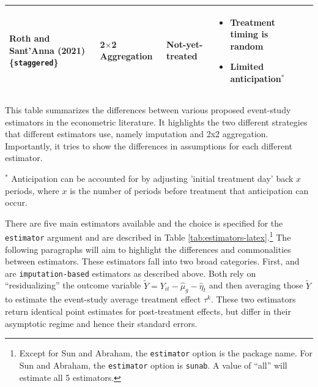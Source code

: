 \begin{landscape}
\begin{table}
\begin{threeparttable}
\begin{tabular}{L{0.2\textwidth}L{0.2\textwidth}L{0.3\textwidth}p{0.5\textwidth}c}
Roth and Sant'Anna (2021) 
\{\texttt{staggered}\}
& 2$\times$2 Aggregation 
& Not-yet-treated 
& 
\vspace{-5mm}
\begin{itemize}[leftmargin=*]
  \item Treatment timing is random
  \item Limited anticipation${^*}$
\end{itemize}
& \\
\bottomrule
\end{tabular}

\begin{tablenotes}
\item { This table summarizes the differences between various proposed event-study estimators in the econometric literature. It highlights the two different strategies that different estimators use, namely imputation and 2x2 aggregation. Importantly, it tries to show the differences in assumptions for each different estimator.}
\item[$^{*}$] { Anticipation can be accounted for by adjusting 'initial treatment day' back $x$ periods, where $x$ is the number of periods before treatment that anticipation can occur.}
\end{tablenotes}

\end{threeparttable}
\end{table}
\end{landscape}

There are five main estimators available and the choice is specified for
the \texttt{estimator} argument and are described in Table
\ref{tab:estimators-latex}.\footnote{Except for Sun and Abraham, the
  \texttt{estimator} option is the package name. For Sun and Abraham,
  the \texttt{estimator} option is \texttt{sunab}. A value of ``all''
  will estimate all 5 estimators.} The following paragraphs will aim to
highlight the differences and commonalities between estimators. These
estimators fall into two broad categories. First,  and
 \citep{didimputation} are
\texttt{imputation-based} estimators as described above. Both rely on
``residualizing'' the outcome variable
\(\tilde{Y} = Y_{it} - \hat{\mu}_g - \hat{\eta}_t\) and then averaging
those \(\tilde{Y}\) to estimate the event-study average treatment effect
\(\tau^k\). These two estimators return identical point estimates for
post-treatment effects, but differ in their asymptotic regime and hence
their standard errors.

